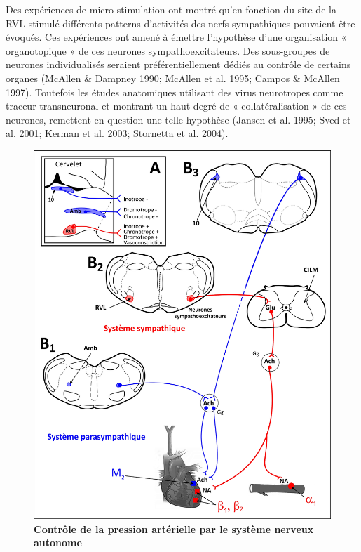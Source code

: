 \documentclass[a4paper,12pt,twoside]{report}
\begin{document}
Des expériences de micro-stimulation ont montré qu’en fonction du site de la RVL stimulé différents patterns d’activités des nerfs sympathiques pouvaient être évoqués. Ces expériences ont amené à émettre l’hypothèse d’une organisation « organotopique » de ces neurones sympathoexcitateurs. Des sous-groupes de neurones individualisés seraient préférentiellement dédiés au contrôle de certains organes (McAllen \& Dampney 1990; McAllen et al. 1995; Campos \& McAllen 1997). Toutefois les études anatomiques utilisant des virus neurotropes comme traceur transneuronal et montrant un haut degré de « collatéralisation » de ces neurones, remettent en question une telle hypothèse (Jansen et al. 1995; Sved et al. 2001; Kerman et al. 2003; Stornetta et al. 2004).

\begin{figure}[p]

\begin{center}
 \includegraphics[width=18cm]{Figure7.jpg} 
\end{center}

\caption{\textbf{Contrôle de la pression artérielle par le système nerveux autonome}}


\end{figure}
\end{document}
